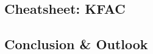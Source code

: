 \documentclass{article}
\begin{document}
\begin{paracol}{1}
  \section{Cheatsheet: KFAC}\label{sec:kfac-cheatsheet}
  
  \end{paracol}
\clearpage

\begin{paracol}{1}
  \section{Conclusion \& Outlook}\label{sec:outlook}
  
\end{paracol}



\appendix
\end{document}
